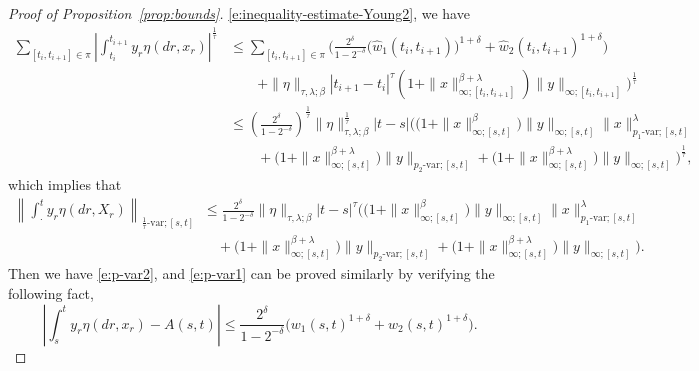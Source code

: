 \documentclass[11pt,reqno]{amsart}
\numberwithin{equation}{section}
\begin{document}
\begin{proof}[Proof of Proposition~\ref{prop:bounds}]
\eqref{e:inequality-estimate-Young2}, we have 
\begin{equation*}
\begin{aligned}
\sum_{[t_{i},t_{i+1}]\in\pi}\left|\int_{t_{i}}^{t_{i+1}}y_{r}\eta(dr,x_{r})\right|^{\frac{1}{\tau}} &\le \sum_{[t_{i},t_{i+1}]\in\pi}\Bigg( \frac{2^{\delta}}{1-2^{-\delta}}\Big(\hat{w}_1(t_{i}, t_{i+1}))^{1+\delta}+\hat{w}_2(t_i,t_{i+1})^{1+\delta}\Big) \\
&\qquad   + \|\eta\|_{\tau,\lambda;\beta}|t_{i+1}-t_i|^{\tau}\left(1+\|x\|^{\beta+\lambda}_{\infty;[t_i,t_{i+1}]}\right)\|y\|_{\infty;[t_i,t_{i+1}]}\Bigg)^{\frac1\tau} \\
&\le \left(\frac{2^{\delta }}{1-2^{-\delta}}\right)^{\frac{1}{\tau}}\|\eta\|^{\frac{1}{\tau}}_{\tau,\lambda;\beta} |t-s| \Bigg(\Big(1+\|x\|^{\beta}_{\infty;[s,t]}\Big)\|y\|_{\infty;[s,t]}\|x\|^{\lambda}_{p_{1}\text{-var};[s,t]}\\ 						&\qquad + \Big(1+\|x\|^{\beta + \lambda}_{\infty;[s,t]}\Big)\|y\|_{p_{2}\text{-var};[s,t]} + \Big(1+\|x\|^{\beta+\lambda}_{\infty;[s,t]}\Big)\|y\|_{\infty;[s,t]}\Bigg)^{\frac{1}{\tau}},
\end{aligned}
\end{equation*}
which implies that 
\begin{equation*}
\begin{aligned}
\left\|\int_{\cdot}^{t}y_{r}\eta(dr,X_{r})\right\|_{\frac{1}{\tau}\text{-var};[s,t]}&\le \frac{2^{\delta }}{1-2^{-\delta}}\|\eta\|_{\tau,\lambda;\beta} |t-s|^{\tau} \Bigg(\Big(1+\|x\|^{\beta}_{\infty;[s,t]}\Big)\|y\|_{\infty;[s,t]}\|x\|^{\lambda}_{p_{1}\text{-var};[s,t]}\\ 
&\quad + \Big(1+\|x\|^{\beta + \lambda}_{\infty;[s,t]}\Big)\|y\|_{p_{2}\text{-var};[s,t]} + \Big(1+\|x\|^{\beta+\lambda}_{\infty;[s,t]}\Big)\|y\|_{\infty;[s,t]}\Bigg).
\end{aligned}
\end{equation*}
Then we have \eqref{e:p-var2}, and \eqref{e:p-var1} can be proved similarly by verifying the following fact,
\begin{equation}\label{e:inequality-estimate-Young3}
\left|\int_{s}^{t} y_{r} \eta(dr,x_{r}) - A(s,t)\right| \le \frac{2^{\delta}}{1-2^{-\delta}}\Big(w_1(s,t)^{1+\delta}+w_2(s,t)^{1+\delta}\Big).
\end{equation}
\end{proof}
\end{document}
